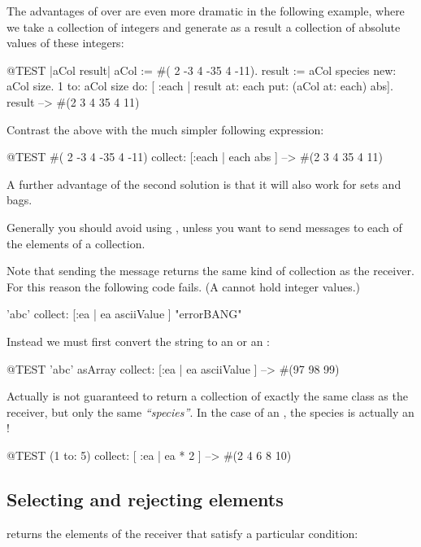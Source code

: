 \documentclass[a4paper,10pt,twoside]{book}
\begin{document}
The advantages of  over  are even more dramatic in the following example, where we take a collection of integers and generate as a result a collection of absolute values of these integers:

\begin{code}{@TEST |aCol result|}
aCol :=  #( 2 -3 4 -35 4 -11).
result := aCol species new: aCol size.
1 to: aCol size do: [ :each | result at: each put: (aCol at: each) abs].
result --> #(2 3 4 35 4 11)
\end{code}
\noindent
Contrast the above with the much simpler following expression:
\begin{code}{@TEST}
#( 2 -3 4 -35 4 -11) collect: [:each | each abs ] --> #(2 3 4 35 4 11)
\end{code}
\noindent
A further advantage of the second solution is that it will also work for sets and bags.

Generally you should avoid using , unless you want to send messages to each of the elements of a collection.

Note that sending the message  returns the same kind of collection as the receiver.
For this reason the following code fails.
(A  cannot hold integer values.)
\begin{code}{}
'abc' collect: [:ea | ea asciiValue ]      "errorBANG"
\end{code}
\noindent
Instead we must first convert the string to an  or an :
\begin{code}{@TEST}
'abc' asArray collect: [:ea | ea asciiValue ] --> #(97 98 99)
\end{code}

Actually  is not guaranteed to return a collection of exactly the same class as the receiver, but only the same \emph{``species''}.  In the case of an , the species is actually an !
\begin{code}{@TEST}
(1 to: 5) collect: [ :ea | ea * 2 ] --> #(2 4 6 8 10)
\end{code}

\subsection{Selecting and rejecting elements}

 returns the elements of the receiver that satisfy a particular condition:
\end{document}
